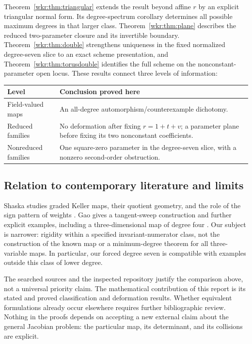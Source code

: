 \documentclass[11pt,a4paper]{article}
\numberwithin{equation}{section}
\theoremstyle{definition}
\theoremstyle{remark}
\begin{document}
Theorem~\ref{wkr:thm:triangular} extends the result beyond affine $r$ by an
explicit triangular normal form. Its degree-spectrum corollary determines
all possible maximum degrees in that larger class.
Theorem~\ref{wkr:thm:plane} describes the reduced two-parameter closure and its
invertible boundary. Theorem~\ref{wkr:thm:double} strengthens uniqueness in the
fixed normalized degree-seven slice to an exact scheme presentation, and Theorem~\ref{wkr:thm:torusdouble} identifies the full
scheme on the nonconstant-parameter open locus. These results connect
three levels of information:
\begin{center}
\begin{tabular}{@{}p{}p{}@{}}
\toprule
Level & Conclusion proved here\\
\midrule
Field-valued maps & An all-degree automorphism/counterexample dichotomy.\\
Reduced families & No deformation after fixing $r=1+t+v$; a parameter plane
before fixing its two nonconstant coefficients.\\
Nonreduced families & One square-zero parameter in the degree-seven slice,
with a nonzero second-order obstruction.\\
\bottomrule
\end{tabular}
\end{center}

\subsection{Relation to contemporary literature and limits}

Shaska studies graded Keller maps, their quotient geometry, and the role of
the sign pattern of weights \cite{shaska}. Gao gives a tangent-sweep
construction and further explicit examples, including a three-dimensional
map of degree four \cite{gao}. Our subject is narrower: rigidity within a
specified invariant-numerator class, not the construction of the known map
or a minimum-degree theorem for all three-variable maps. In particular, our
forced degree seven is compatible with examples outside this class of lower
degree.

The searched sources and the inspected repository justify the comparison
above, not a universal priority claim. The mathematical contribution of this
report is its stated and proved classification and deformation results.
Whether equivalent formulations already occur elsewhere requires further
bibliographic review. Nothing in the proofs depends on accepting a new
external claim about the general Jacobian problem: the particular map,
its determinant, and its collisions are explicit.
\end{document}
